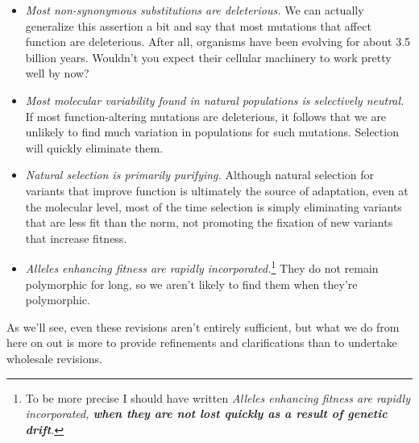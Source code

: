 \begin{itemize}

\item {\it Most non-synonymous substitutions are deleterious.\/} We
  can actually generalize this assertion a bit and say that most
  mutations that affect function are deleterious. After all, organisms
  have been evolving for about 3.5 billion years. Wouldn't you expect
  their cellular machinery to work pretty well by now?

\item {\it Most molecular variability found in natural populations is
    selectively neutral.} If most function-altering mutations are
  deleterious, it follows that we are unlikely to find much variation
  in populations for such mutations. Selection will quickly eliminate
  them.

\item {\it Natural selection is primarily purifying.} Although natural
  selection for variants that improve function is ultimately the
  source of adaptation, even at the molecular level, most of the time
  selection is simply eliminating variants that are less fit than the
  norm, not promoting the fixation of new variants that increase
  fitness.

\item {\it Alleles enhancing fitness are rapidly
    incorporated.}\footnote{To be more precise I should have written
    {\it Alleles enhancing fitness are rapidly incorporated, {\bf when
        they are not lost quickly as a result of genetic drift}.\/}}
  They do not remain polymorphic for long, so we aren't likely to find
  them when they're polymorphic.

\end{itemize}

As we'll see, even these revisions aren't entirely sufficient, but
what we do from here on out is more to provide refinements and
clarifications than to undertake wholesale revisions.

